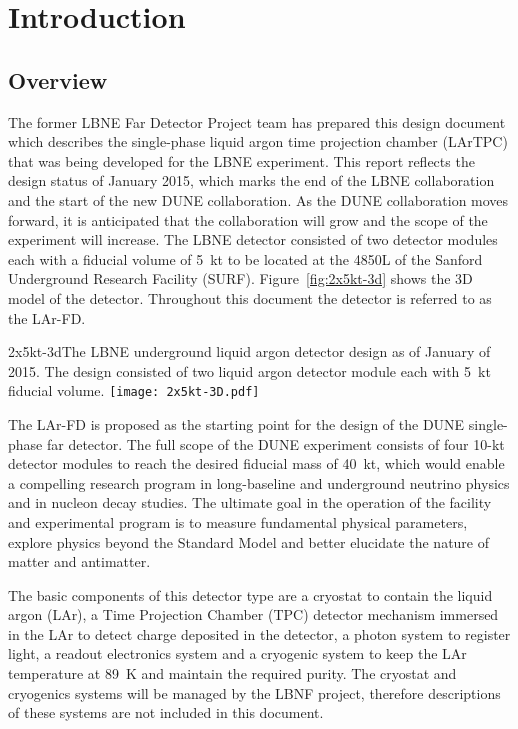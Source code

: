 \chapter{Introduction}

\section{Overview}


The former LBNE Far Detector Project team has prepared this design document which describes the single-phase liquid argon time projection chamber (LArTPC) that was being developed for the LBNE experiment. This report reflects the design status of January 2015, which marks the end of the LBNE collaboration and the start of the new DUNE collaboration. As the DUNE collaboration moves forward, it is anticipated that the collaboration will grow and the scope of the experiment will increase. The LBNE detector consisted of two detector modules each with a fiducial volume of 5~kt to be located at the 4850L of the Sanford Underground Research Facility (SURF). Figure~\ref{fig:2x5kt-3d} shows the 3D model of the detector. Throughout this document the detector is referred to as the LAr-FD. 

\begin{cdrfigure}{2x5kt-3d}{The LBNE underground liquid argon detector design as of January of 2015. The design consisted of two liquid argon detector module each with 5~kt fiducial volume.}
\texttt{[image: 2x5kt-3D.pdf]}
 \end{cdrfigure}

The LAr-FD is proposed as the starting point for the design of the DUNE single-phase far detector. The full scope of the DUNE experiment consists of four 10-kt detector modules to reach the desired fiducial mass of 40~kt, which would enable a compelling research program in long-baseline and underground neutrino physics and in nucleon decay studies. The ultimate goal in the operation of the facility and experimental program is to measure fundamental physical parameters, explore physics beyond the Standard Model and better elucidate the nature of matter and antimatter. 

The basic components of this detector type are a cryostat to contain the liquid argon (LAr),  a  Time Projection Chamber (TPC) detector mechanism immersed in the LAr to detect charge deposited in the detector, a photon system to register light, a readout electronics system and a cryogenic system to keep the LAr temperature at 89~K and maintain the required purity.  The cryostat and cryogenics systems will be managed by the LBNF project, therefore descriptions of these systems are not included in this document. 

